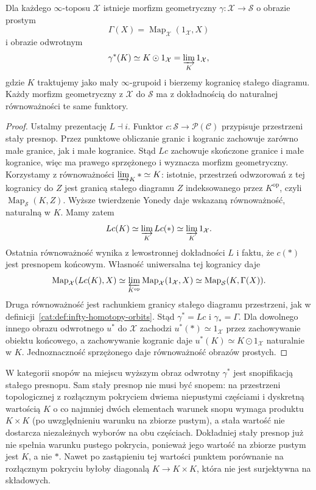 \begin{stwierdzenie}\label{cat:prop:infty-topos-global-sections}
Dla każdego $\infty$-toposu $\mathcal X$ istnieje morfizm geometryczny $\gamma:\mathcal X\to\mathcal S$ o obrazie prostym
\[
 \Gamma(X)=\operatorname{Map}_{\mathcal X}(1_{\mathcal X},X)
\]
i obrazie odwrotnym
\[
 \gamma^*(K)\simeq K\odot1_{\mathcal X}
 =\varinjlim_{K}1_{\mathcal X},
\]
gdzie $K$ traktujemy jako mały $\infty$-grupoid i bierzemy kogranicę stałego diagramu. Każdy morfizm geometryczny z $\mathcal X$ do $\mathcal S$ ma z dokładnością do naturalnej równoważności te same funktory.
\end{stwierdzenie}
\begin{proof}
Ustalmy prezentację $L\dashv i$. Funktor $c:\mathcal S\to\mathcal P(\mathcal C)$ przypisuje przestrzeni stały presnop. Przez punktowe obliczanie granic i kogranic zachowuje zarówno małe granice, jak i małe kogranice. Stąd $Lc$ zachowuje skończone granice i małe kogranice, więc ma prawego sprzężonego i wyznacza morfizm geometryczny. Korzystamy z równoważności $\varinjlim_{K}*\simeq K$: istotnie, przestrzeń odwzorowań z tej kogranicy do $Z$ jest granicą stałego diagramu $Z$ indeksowanego przez $K^{\mathrm{op}}$, czyli $\operatorname{Map}_{\mathcal S}(K,Z)$. Wyższe twierdzenie Yonedy daje wskazaną równoważność, naturalną w $K$. Mamy zatem
\[
 Lc(K)\simeq\varinjlim_K Lc(*)\simeq\varinjlim_K1_{\mathcal X}.
\]
Ostatnia równoważność wynika z lewostronnej dokładności $L$ i faktu, że $c(*)$ jest presnopem końcowym. Własność uniwersalna tej kogranicy daje
\[
 \operatorname{Map}_{\mathcal X}(Lc(K),X)
 \simeq \varprojlim_{K^{\mathrm{op}}}\operatorname{Map}_{\mathcal X}(1_{\mathcal X},X)
 \simeq \operatorname{Map}_{\mathcal S}(K,\Gamma(X)).
\]
Druga równoważność jest rachunkiem granicy stałego diagramu przestrzeni, jak w definicji~\ref{cat:def:infty-homotopy-orbits}. Stąd $\gamma^*=Lc$ i $\gamma_*=\Gamma$. Dla dowolnego innego obrazu odwrotnego $u^*$ do $\mathcal X$ zachodzi $u^*(*)\simeq1_{\mathcal X}$ przez zachowywanie obiektu końcowego, a zachowywanie kogranic daje $u^*(K)\simeq K\odot1_{\mathcal X}$ naturalnie w $K$. Jednoznaczność sprzężonego daje równoważność obrazów prostych.
\end{proof}

W kategorii snopów na miejscu wyższym obraz odwrotny $\gamma^*$ jest snopifikacją stałego presnopu. Sam stały presnop nie musi być snopem: na przestrzeni topologicznej z rozłącznym pokryciem dwiema niepustymi częściami i dyskretną wartością $K$ o co najmniej dwóch elementach warunek snopu wymaga produktu $K\times K$ (po uwzględnieniu warunku na zbiorze pustym), a stała wartość nie dostarcza niezależnych wyborów na obu częściach. Dokładniej stały presnop już nie spełnia warunku pustego pokrycia, ponieważ jego wartość na zbiorze pustym jest $K$, a nie $*$. Nawet po zastąpieniu tej wartości punktem porównanie na rozłącznym pokryciu byłoby diagonalą $K\to K\times K$, która nie jest surjektywna na składowych.

